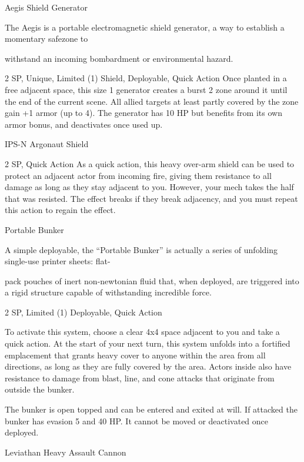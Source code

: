 Aegis Shield Generator  

The Aegis is a portable electromagnetic shield generator, a way to establish a momentary safezone to  

withstand an incoming bombardment or environmental hazard.     

2 SP, Unique, Limited (1)  
Shield, Deployable, Quick Action  
Once planted in a free adjacent space, this size 1 generator creates a burst 2 zone around it until  
the end of the current scene. All allied targets at least partly covered by the zone gain +1 armor  
(up to 4). The generator has 10 HP but benefits from its own armor bonus, and deactivates once  
used up.
 

IPS-N Argonaut Shield  

2 SP, Quick Action  
As a quick action, this heavy over-arm shield can be used to protect an adjacent actor from  
incoming fire, giving them resistance to all damage as long as they stay adjacent to you.  
However, your mech takes the half that was resisted. The effect breaks if they break adjacency,  
and you must repeat this action to regain the effect.
 

Portable Bunker
 

A simple deployable, the “Portable Bunker” is actually a series of unfolding single-use printer sheets: flat- 

pack pouches of inert non-newtonian fluid that, when deployed, are triggered into a rigid structure capable  
of withstanding incredible force.   

2 SP, Limited (1)  
Deployable, Quick Action
 
To activate this system, choose a clear 4x4 space adjacent to you and take a quick action. At the  
start of your next turn, this system unfolds into a fortified emplacement that grants heavy cover  
to anyone within the area from all directions, as long as they are fully covered by the area. Actors  
inside also have resistance to damage from blast, line, and cone attacks that originate from  
outside the bunker.
 

The bunker is open topped and can be entered and exited at will. If attacked the bunker has  
evasion 5 and 40 HP. It cannot be moved or deactivated once deployed.
 

                                                                                                                  


Leviathan Heavy Assault Cannon  

